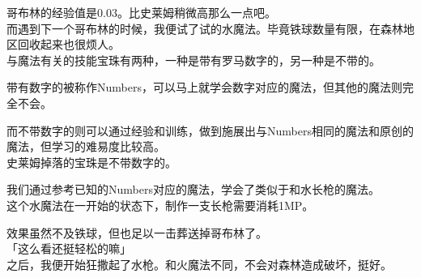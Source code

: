 哥布林的经验值是0.03。比史莱姆稍微高那么一点吧。\\

而遇到下一个哥布林的时候，我便试了试的水魔法。毕竟铁球数量有限，在森林地区回收起来也很烦人。\\

与魔法有关的技能宝珠有两种，一种是带有罗马数字的，另一种是不带的。

带有数字的被称作Numbers，可以马上就学会数字对应的魔法，但其他的魔法则完全不会。

而不带数字的则可以通过经验和训练，做到施展出与Numbers相同的魔法和原创的魔法，但学习的难易度比较高。\\

史莱姆掉落的宝珠是不带数字的。

我们通过参考已知的Numbers对应的魔法，学会了类似于和水长枪的魔法。\\

这个水魔法在一开始的状态下，制作一支长枪需要消耗1MP。

效果虽然不及铁球，但也足以一击葬送掉哥布林了。\\

「这么看还挺轻松的嘛」\\

之后，我便开始狂撒起了水枪。和火魔法不同，不会对森林造成破坏，挺好。

